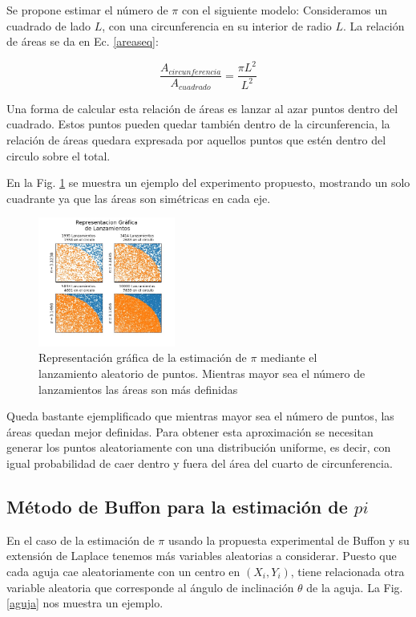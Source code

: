 \documentclass{rbf}
\begin{document}
Se propone estimar el número de $\pi$ con el siguiente modelo:
Consideramos un cuadrado de lado $L$, con una circunferencia en su interior de radio $L$.
La relación de áreas se da en Ec. \ref{areaseq}:

\begin{equation}
	\frac{A_{circunferencia}}{A_{cuadrado}}=\frac{\pi L^2}{L^2}
\label{areaseq}	
\end{equation}

Una forma de calcular esta relación de áreas es lanzar al azar puntos dentro del cuadrado. Estos puntos pueden quedar también dentro de la circunferencia, la relación de áreas quedara expresada por aquellos puntos que estén dentro del circulo sobre el total.

En la Fig. \ref{area} se muestra un ejemplo del experimento propuesto, mostrando un solo cuadrante ya que las áreas son simétricas en cada eje.

\begin{figure}[htbp!]
 \centering
  \includegraphics[width=0.4\textwidth]{figures/areas.jpg}
	\caption{Representación gráfica de la estimación de $\pi$ mediante el lanzamiento aleatorio de puntos. Mientras mayor sea el número de lanzamientos las áreas son más definidas}
 \label{area}
\end{figure}

Queda bastante ejemplificado que mientras mayor sea el número de puntos, las áreas quedan mejor definidas.
Para obtener esta aproximación se necesitan generar los puntos aleatoriamente con una distribución uniforme, es decir, con igual probabilidad de caer dentro y fuera del área del cuarto de circunferencia.

\subsection{Método de Buffon para la estimación de $pi$}

En el caso de la estimación de $\pi$ usando la propuesta experimental de Buffon y su extensión de Laplace tenemos más variables aleatorias a considerar. Puesto que cada aguja cae aleatoriamente con un centro en $(X_i,Y_i)$, tiene relacionada otra variable aleatoria que corresponde al ángulo de inclinación $\theta$ de la aguja. La Fig.\ref{aguja} nos muestra un ejemplo.
\end{document}
